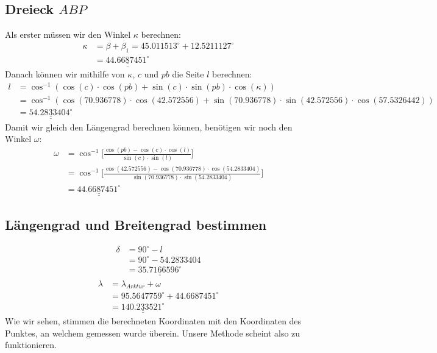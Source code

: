\subsection{Dreieck $ABP$}
Als erster müssen wir den Winkel $\kappa$ berechnen:
\begin{align}
	\kappa &= \beta + \beta_1 = 45.011513^\circ + 12.5211127^\circ \nonumber \\
	&=\underline{\underline{44.6687451^\circ}} \nonumber
\end{align}
Danach können wir mithilfe von $\kappa$, $c$ und $pb$ die Seite $l$ berechnen:
\begin{align}
	l &= \cos^{-1}(\cos(c) \cdot \cos(pb) + \sin(c) \cdot \sin(pb) \cdot \cos(\kappa)) \nonumber \\
	&= \cos^{-1}(\cos(70.936778) \cdot \cos(42.572556) + \sin(70.936778) \cdot \sin(42.572556) \cdot \cos(57.5326442)) \nonumber \\
	&= \underline{\underline{54.2833404^\circ}} \nonumber
\end{align}
Damit wir gleich den Längengrad berechnen können, benötigen wir noch den Winkel $\omega$:
\begin{align}
	\omega &= \cos^{-1}  \bigg[\frac{\cos(pb)-\cos(c) \cdot \cos(l)}{\sin(c) \cdot \sin(l)}\bigg] \nonumber \\
	&=\cos^{-1}  \bigg[\frac{\cos(42.572556)-\cos(70.936778) \cdot \cos(54.2833404)}{\sin(70.936778) \cdot \sin(54.2833404)}\bigg] \nonumber \\
	&= \underline{\underline{44.6687451^\circ}} \nonumber
\end{align}

\subsection{Längengrad und Breitengrad bestimmen}

\begin{align}
	\delta &= 90^\circ - l \nonumber \\
	&= 90^\circ - 54.2833404 \nonumber \\
	&= \underline{\underline{35.7166596^\circ}} \nonumber
\end{align}
\begin{align}
	\lambda &= \lambda_{Arktur} + \omega \nonumber \\
	&= 95.5647759^\circ + 44.6687451^\circ \nonumber \\
	&= \underline{\underline{140.233521^\circ}} \nonumber
\end{align}
Wie wir sehen, stimmen die berechneten Koordinaten mit den Koordinaten des Punktes, an welchem gemessen wurde überein. 
Unsere Methode scheint also zu funktionieren.




